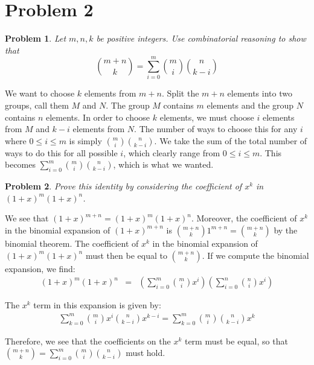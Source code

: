 \documentclass[psamsfonts]{amsart}
\newtheorem{prob}{Problem}[section]
\newenvironment{sol}{{\bfseries Solution}}{\qedsymbol}
\theoremstyle{definition}
\theoremstyle{remark}
\numberwithin{equation}{section}
\begin{document}
\section{Problem 2}

\begin{prob}
Let $m,n,k$ be positive integers. Use combinatorial reasoning to show that
\begin{equation}
{ m + n \choose k } = \sum_{i=0}^m { m \choose i } {n \choose k - i }
\end{equation}
\end{prob}

\begin{sol}
We want to choose $k$ elements from $m + n$. Split the $m + n$ elements into two groups, call them $M$ and $N$. The group $M$ contains $m$ elements and the group $N$ contains $n$ elements. In order to choose $k$ elements, we must choose $i$ elements from $M$ and $k - i$ elements from $N$. The number of ways to choose this for any $i$ where $0 \leq i \leq m$ is simply ${ m \choose i } {n \choose k - i}$. We take the sum of the total number of ways to do this for all possible $i$, which clearly range from $0 \leq i \leq m$. This becomes $\sum_{i=0}^m { m \choose i } {n \choose k - i }$, which is what we wanted.
\end{sol}

\begin{prob}
Prove this identity by considering the coefficient of $x^k$ in $(1+x)^m(1+x)^n$.
\end{prob}

\begin{sol}
We see that $(1+x)^{m+n} = (1+x)^m (1+x)^n$. Moreover, the coefficient of $x^k$ in the binomial expansion of $(1+x)^{m+n}$ is ${m + n \choose k } 1^{m + n} = { m + n \choose k }$ by the binomial theorem. The coefficient of $x^k$ in the binomial expansion of $(1+x)^m (1+x)^n$ must then be equal to ${ m + n \choose k }$. If we compute the binomial expansion, we find:
\begin{eqnarray}
(1+x)^m(1+x)^n &=& \left( \sum_{i=0}^m {m \choose i} x^i \right) \left( \sum_{i=0}^n {n \choose i} x^i \right) 
\end{eqnarray}

The $x^k$ term in this expansion is given by:
\begin{eqnarray}
\sum_{k = 0}^m { m \choose i} x^i { n \choose k - i} x^{k-i} = \sum_{k=0}^m {m \choose i} {n \choose k - i} x^k
\end{eqnarray}

Therefore, we see that the coefficients on the $x^k$ term must be equal, so that ${ m + n \choose k } = \sum_{i=0}^m { m \choose i } {n \choose k - i }$ must hold.
\end{sol}
\end{document}
